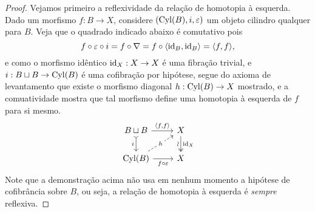 \begin{proof}
  Vejamos primeiro a reflexividade da relação de homotopia à esquerda.
  Dado um morfismo $f: B \to X$, considere $(\mathrm{Cyl}(B),i,\varepsilon)$ um objeto cilindro qualquer para $B$.
  Veja que o quadrado indicado abaixo é comutativo pois
  \begin{displaymath}
    f \circ \varepsilon \circ i = f \circ \nabla = f \circ \langle \mathrm{id}_{B},\mathrm{id}_{B} \rangle = \langle f,f \rangle,
  \end{displaymath}
  e como o morfismo idêntico $\mathrm{id}_{X}: X \to X$ é uma fibração trivial, e $i: B \sqcup B \to \mathrm{Cyl}(B)$ é uma cofibração por hipótese, segue do axioma de levantamento que existe o morfismo diagonal $h: \mathrm{Cyl}(B) \to X$ mostrado, e a comuatividade mostra que tal morfismo define uma homotopia à esquerda de $f$ para si mesmo.
  \begin{displaymath}
    \begin{tikzcd}
      B \sqcup B
      \arrow[r, "{\langle f,f \rangle}"]
      \arrow[d, tail, "i" swap]
      & X
      \arrow[d, two heads, "\id_{X}", "\sim" {swap, sloped}]
      \\ \Cyl(B)
      \arrow[r, "f \circ \varepsilon" swap]
      \arrow[ru, dashed, "h" description]
      & X
    \end{tikzcd}
  \end{displaymath}
  Note que a demonstração acima não usa em nenhum momento a hipótese de cofibrância sobre $B$, ou seja, a relação de homotopia à esquerda é \emph{sempre} reflexiva.


\end{proof}
